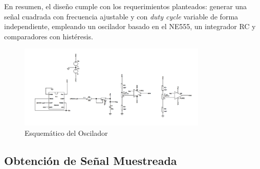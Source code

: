 En resumen, el diseño cumple con los requerimientos planteados: generar una señal cuadrada con frecuencia ajustable y con \textit{duty cycle} variable de forma independiente, empleando un oscilador basado en el NE555, un integrador RC y comparadores con histéresis.
\begin{figure}[H]
    \centering
    \includegraphics[width=0.8\textwidth]{Imagenes/esquematico_oscilador.png}
    \caption{Esquemático del Oscilador}
    \label{esquematico_oscilador}
\end{figure}

\subsection{Obtención de Señal Muestreada}

